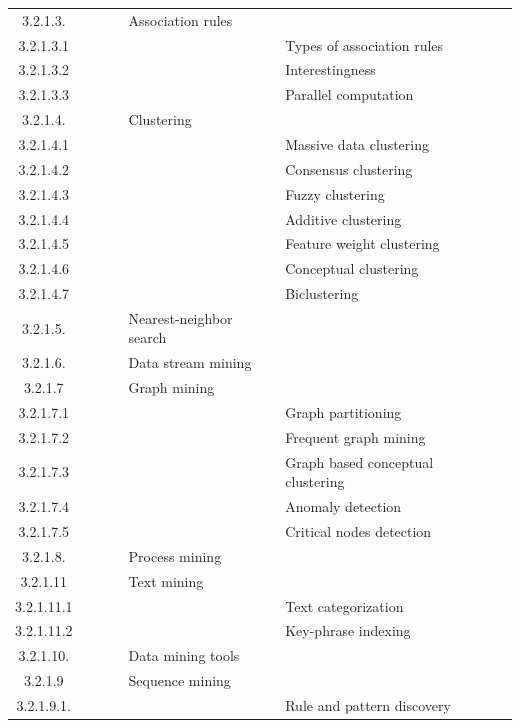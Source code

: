 \documentclass[12pt]{article}
\begin{document}
\begin{center}
{\begin{tabularx}{\linewidth}{|c|X|X|X|X|X|X|}
		3.2.1.3. &   &   &   &  Association rules &   &   \\
		3.2.1.3.1 &   &   &   &   &  Types of association rules &   \\
		3.2.1.3.2 &   &   &   &   &  Interestingness &   \\
		3.2.1.3.3 &   &   &   &   &  Parallel computation &   \\
		3.2.1.4. &   &   &   &  Clustering &   &   \\
		3.2.1.4.1 &   &   &   &   &  Massive data clustering &   \\
		3.2.1.4.2 &   &   &   &   &  Consensus clustering &   \\
		3.2.1.4.3 &   &   &   &   &  Fuzzy clustering &   \\
		3.2.1.4.4 &   &   &   &   &  Additive clustering &   \\
		3.2.1.4.5 &   &   &   &   &  Feature weight clustering &   \\
		3.2.1.4.6 &   &   &   &   &  Conceptual clustering &   \\
		3.2.1.4.7 &   &   &   &   &  Biclustering &   \\
		3.2.1.5. &   &   &   &  Nearest-neighbor search &   &   \\
		3.2.1.6. &   &   &   &  Data stream mining &   &   \\
		3.2.1.7 &   &   &   &  Graph mining &   &   \\
		3.2.1.7.1 &   &   &   &   &  Graph partitioning &   \\
		3.2.1.7.2 &   &   &   &   &  Frequent graph mining &   \\
		3.2.1.7.3 &   &   &   &   &  Graph based conceptual clustering &   \\
		3.2.1.7.4 &   &   &   &   &  Anomaly detection &   \\
		3.2.1.7.5 &   &   &   &   &  Critical nodes detection &   \\
		3.2.1.8. &   &   &   &  Process mining &   &   \\
		3.2.1.11 &   &   &   &  Text mining &   &   \\
		3.2.1.11.1 &   &   &   &   &  Text categorization &   \\
		3.2.1.11.2 &   &   &   &   &  Key-phrase indexing &   \\
		3.2.1.10. &   &   &   &  Data mining tools &   &   \\
		3.2.1.9 &   &   &   &  Sequence mining &   &   \\
		3.2.1.9.1. &   &   &   &   &  Rule and pattern discovery &   \\

\end{tabularx}}
\end{center}
\end{document}
